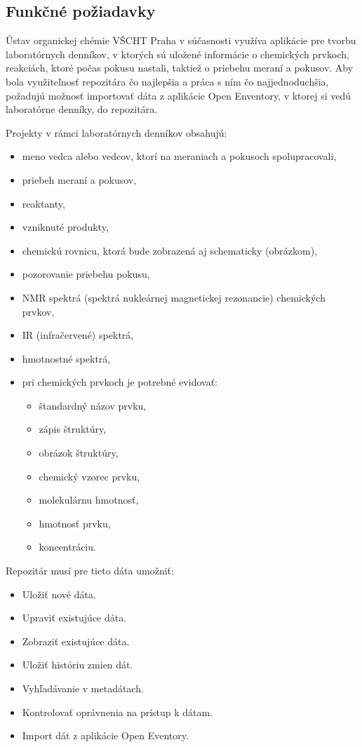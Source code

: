 \documentclass[thesis=M,slovak]{FITthesis}[2013/05/06]
\begin{document}
\subsection{Funkčné požiadavky}

Ústav organickej chémie VŠCHT Praha v súčasnosti využíva aplikácie pre tvorbu laboratórnych denníkov, v ktorých sú uložené informácie o chemických prvkoch, reakciách, ktoré počas pokusu nastali, taktiež o priebehu meraní a pokusov. Aby bola využiteľnosť repozitára čo najlepšia a práca s ním čo najjednoduchšia, požadujú možnosť importovať dáta z aplikácie Open Enventory, v ktorej si vedú laboratórne denníky, do repozitára. 

Projekty v rámci laboratórnych denníkov obsahujú: 
		\begin{itemize}
			\item meno vedca alebo vedcov, ktorí na meraniach a pokusoch spolupracovali,
			\item priebeh meraní a pokusov,
			\item reaktanty,
			\item vzniknuté produkty,
			\item chemickú rovnicu, ktorá bude zobrazená aj schematicky (obrázkom),
			\item pozorovanie priebehu pokusu,
			\item NMR spektrá (spektrá nukleárnej magnetickej rezonancie) chemických prvkov,
			\item IR (infračervené) spektrá,
			\item hmotnostné spektrá,
			\item pri chemických prvkoch je potrebné evidovať:
				\begin{itemize}
					\item štandardný názov prvku,
					\item zápis štruktúry,
					\item obrázok štruktúry,
					\item chemický vzorec prvku,
					\item molekulárnu hmotnosť,
					\item hmotnosť prvku,
					\item koncentráciu.
				\end{itemize}
		\end{itemize}

Repozitár musí pre tieto dáta umožniť:
\begin{itemize}
	\item Uložiť nové dáta.
	\item Upraviť existujúce dáta.
	\item Zobraziť existujúce dáta.
	\item Uložiť históriu zmien dát.
	\item Vyhľadávanie v metadátach.
	\item Kontrolovať oprávnenia na prístup k dátam.
	\item Import dát z aplikácie Open Eventory.
\end{itemize}
\end{document}
